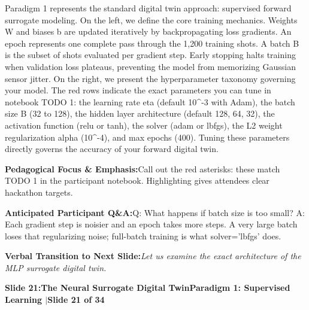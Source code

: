 \documentclass[11pt,a4paper]{article}
\begin{document}
\begin{tcolorbox}[colback=white,colframe=primaryblue,title={\footnotesize\bfseries\color{white}Spoken Presenter Script},fontupper=\small,left=6pt,right=6pt,top=3pt,bottom=3pt,boxrule=0.8pt,arc=2.5pt]
Paradigm 1 represents the standard digital twin approach: supervised forward surrogate modeling. On the left, we define the core training mechanics. Weights W and biases b are updated iteratively by backpropagating loss gradients. An epoch represents one complete pass through the 1,200 training shots. A batch B is the subset of shots evaluated per gradient step. Early stopping halts training when validation loss plateaus, preventing the model from memorizing Gaussian sensor jitter. On the right, we present the hyperparameter taxonomy governing your model. The red rows indicate the exact parameters you can tune in notebook TODO 1: the learning rate eta (default 10\textasciicircum{}-3 with Adam), the batch size B (32 to 128), the hidden layer architecture (default 128, 64, 32), the activation function (relu or tanh), the solver (adam or lbfgs), the L2 weight regularization alpha (10\textasciicircum{}-4), and max epochs (400). Tuning these parameters directly governs the accuracy of your forward digital twin.
\end{tcolorbox}
\vspace{0.2em}
\begin{tcolorbox}[colback=lightbg,colframe=bordergray,left=6pt,right=6pt,top=3pt,bottom=3pt,boxrule=0.6pt,arc=2.5pt]
\small
\noindent\textbf{\color{navy}Pedagogical Focus \& Emphasis:}\enspace Call out the red asterisks: these match TODO 1 in the participant notebook. Highlighting gives attendees clear hackathon targets.\par\vspace{0.3em}
\noindent\textbf{\color{successgreen}Anticipated Participant Q\&A:}\enspace Q: What happens if batch size is too small? A: Each gradient step is noisier and an epoch takes more steps. A very large batch loses that regularizing noise; full-batch training is what solver='lbfgs' does.\par\vspace{0.3em}
\noindent\textbf{\color{accent}Verbal Transition to Next Slide:}\enspace \emph{Let us examine the exact architecture of the MLP surrogate digital twin.}
\end{tcolorbox}
\clearpage
\hypertarget{slide.21}{}
{}
\noindent\begin{tcolorbox}[colback=navy,colframe=navy,left=6pt,right=6pt,top=3pt,bottom=3pt,boxrule=0pt,arc=2pt]
{\large\bfseries\color{white}Slide 21:\enspace The Neural Surrogate Digital Twin}\hfill{\footnotesize\bfseries\color{white!85!lightbg}Paradigm 1: Supervised Learning \enspace$|$\enspace Slide 21 of 34}
\end{tcolorbox}
\end{document}
